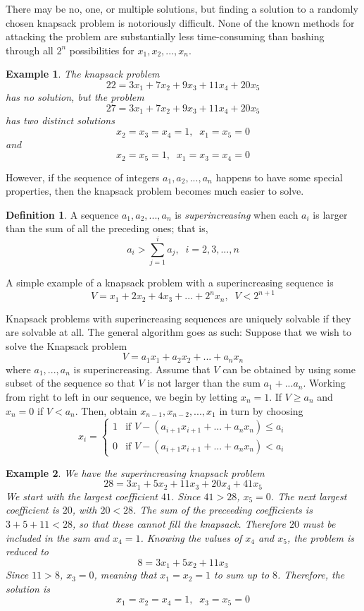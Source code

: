 \documentclass{article}
\newtheorem{example}{Example}[section]
\theoremstyle{remark}
\theoremstyle{definition}
\newtheorem{definition}{Definition}[section]
\begin{document}
There may be no, one, or multiple solutions, but finding a solution to a randomly chosen knapsack problem is notoriously difficult. None of the known methods for attacking the problem are substantially less time-consuming than bashing through all $2^n$ possibilities for $x_1, x_2, ..., x_n$. 

\begin{example}
The knapsack problem 
\[22 = 3x_1 + 7x_2 + 9x_3 + 11x_4 + 20x_5 \]
has no solution, but the problem 
\[27 = 3x_1 + 7x_2 + 9x_3 + 11x_4 + 20x_5 \]
has two distinct solutions 
\[x_2 = x_3 = x_4 = 1, \;\; x_1 = x_5 = 0\]
and 
\[x_2 = x_5 = 1, \;\; x_1 = x_3 = x_4 = 0\]
\end{example}

However, if the sequence of integers $a_1, a_2, ..., a_n$ happens to have some special properties, then the knapsack problem becomes much easier to solve. 

\begin{definition}
A sequence $a_1, a_2, ..., a_n$ is \textit{superincreasing} when each $a_i$ is larger than the sum of all the preceding ones; that is, 
\[a_i > \sum_{j=1}^i a_j, \;\; i = 2, 3, ..., n\]
\end{definition}

A simple example of a knapsack problem with a superincreasing sequence is 
\[V = x_1 + 2x_2 + 4x_3 + ... + 2^n x_n, \;\; V < 2^{n+1}\]

Knapsack problems with superincreasing sequences are uniquely solvable if they are solvable at all. The general algorithm goes as such: Suppose that we wish to solve the Knapsack problem 
\[V = a_1 x_1 + a_2 x_2 + ... + a_n x_n\]
where $a_1, ..., a_n$ is superincreasing. Assume that $V$ can be obtained by using some subset of the sequence so that $V$ is not larger than the sum $a_1 + ... a_n$. Working from right to left in our sequence, we begin by letting $x_n = 1$. If $V \geq a_n$ and $x_n = 0$ if $V<a_n$. Then, obtain $x_{n-1}, x_{n-2}, ..., x_1$ in turn by choosing
\[x_i = \begin{cases}
1 & \text{if } V - (a_{i+1}x_{i+1} + ... + a_n x_n) \leq a_i \\
0 & \text{if } V - (a_{i+1}x_{i+1} + ... + a_n x_n) < a_i
\end{cases}\]

\begin{example}
We have the superincreasing knapsack problem
\[28 = 3x_1 + 5x_2 + 11x_3 + 20x_4 + 41x_5\]
We start with the largest coefficient $41$. Since $41>28$, $x_5 = 0$. The next largest coefficient is $20$, with $20<28$. The sum of the preceeding coefficients is $3+5+11<28$, so that these cannot fill the knapsack. Therefore $20$ must be included in the sum and $x_4 = 1$. Knowing the values of $x_4$ and $x_5$, the problem is reduced to 
\[8 = 3x_1 + 5x_2 + 11x_3\]
Since $11 > 8$, $x_3 = 0$, meaning that $x_1 = x_2 = 1$ to sum up to $8$. Therefore, the solution is 
\[x_1 = x_2 = x_4 = 1, \;\; x_3 = x_5 = 0\]
\end{example}
\end{document}
